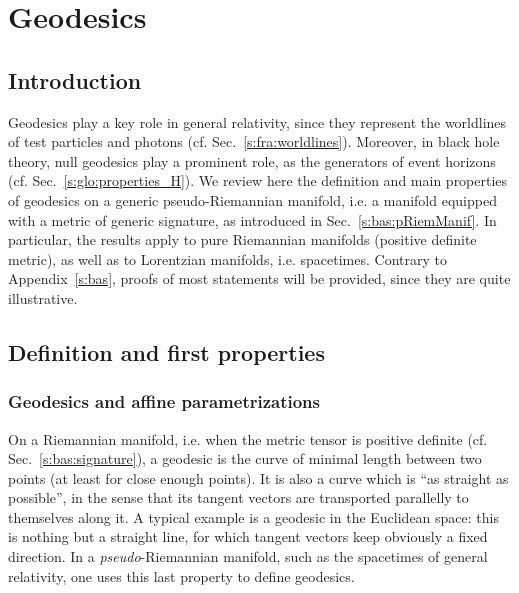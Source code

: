 \chapter{Geodesics} \label{s:geo}

\minitoc

\section{Introduction}

Geodesics play a key role in general relativity, since they represent
the worldlines of test particles and photons
(cf. Sec.~\ref{s:fra:worldlines}). Moreover, in black hole theory,
null geodesics play a prominent role, as the generators of event horizons
(cf. Sec.~\ref{s:glo:properties_H}). We review here the definition and
main properties of geodesics on a generic pseudo-Riemannian manifold,
i.e. a manifold equipped with a metric of generic signature, as introduced in
Sec.~\ref{s:bas:pRiemManif}.
In particular, the results apply to pure Riemannian manifolds (positive
definite metric), as well as to Lorentzian manifolds, i.e.
spacetimes.
Contrary to Appendix~\ref{s:bas}, proofs of most statements will be provided,
since they are quite illustrative.


\section{Definition and first properties}

\subsection{Geodesics and affine parametrizations} \label{s:geo:def}

On a Riemannian manifold, i.e. when the metric tensor is positive definite
(cf. Sec.~\ref{s:bas:signature}), a geodesic is the curve of minimal length between
two points (at least for close enough points). It is also a curve which is
``as straight as possible'', in the sense that its tangent vectors are transported parallelly
to themselves along it. A typical example is a geodesic in the Euclidean space: this is
nothing but a straight line, for which tangent vectors
keep obviously a fixed direction. In a \emph{pseudo}-Riemannian manifold, such as the
spacetimes of general relativity, one uses
this last property to define geodesics.


